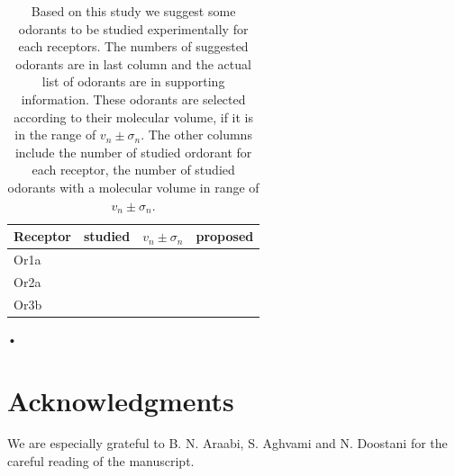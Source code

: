\documentclass[11pt]{paper} %
\begin{document}
\begin{table}
\centering
	\begin{tabular}{|l|r|r|r|}
		\hline 
		Receptor & studied & $v_n \pm \sigma_n$ & proposed\\ \hline 
		Or1a & & & \\
		Or2a & & & \\
		Or3b & & & \\	\hline
	\end{tabular}
	\caption{Based on this study we suggest some odorants to be studied experimentally for each receptors. 		
		The numbers of suggested odorants are in last column and the actual list of odorants are in supporting information.
		These odorants are selected according to their molecular volume, if it is in the range of $v_n \pm \sigma_n$.
		The other columns include the number of studied ordorant for each receptor, 
		the number of studied odorants with a molecular volume in range of $v_n \pm \sigma_n$.}
	\label{tab:receptor-odorant}
\end{table}•

\section{Acknowledgments}
We are especially grateful to B. N. Araabi, S. Aghvami and N. Doostani for the careful reading of the manuscript.



\end{document}
